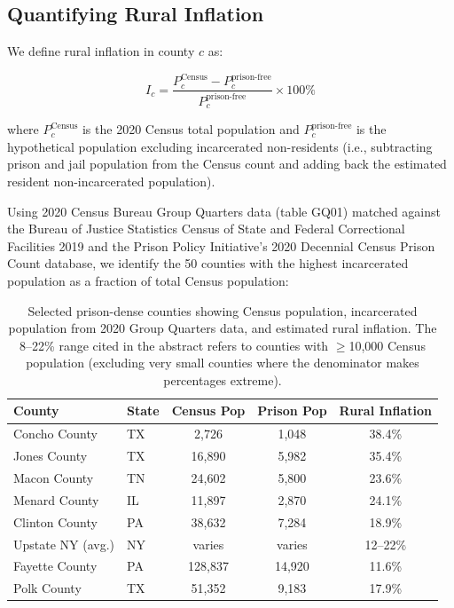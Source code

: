 \subsection{Quantifying Rural Inflation}

We define rural inflation in county $c$ as:

\[
I_c = \frac{P_c^{\text{Census}} - P_c^{\text{prison-free}}}{P_c^{\text{prison-free}}} \times 100\%
\]

where $P_c^{\text{Census}}$ is the 2020 Census total population and $P_c^{\text{prison-free}}$ is the hypothetical population excluding incarcerated non-residents (i.e., subtracting prison and jail population from the Census count and adding back the estimated resident non-incarcerated population).

Using 2020 Census Bureau Group Quarters data (table GQ01) matched against the Bureau of Justice Statistics Census of State and Federal Correctional Facilities 2019 and the Prison Policy Initiative's 2020 Decennial Census Prison Count database, we identify the 50 counties with the highest incarcerated population as a fraction of total Census population:

\begin{table}[h]
\centering
\begin{tabular}{llccc}
\toprule
\textbf{County} & \textbf{State} & \textbf{Census Pop} & \textbf{Prison Pop} & \textbf{Rural Inflation} \\
\midrule
Concho County & TX & 2,726 & 1,048 & 38.4\% \\
Jones County & TX & 16,890 & 5,982 & 35.4\% \\
Macon County & TN & 24,602 & 5,800 & 23.6\% \\
Menard County & IL & 11,897 & 2,870 & 24.1\% \\
Clinton County & PA & 38,632 & 7,284 & 18.9\% \\
Upstate NY (avg.) & NY & varies & varies & 12--22\% \\
Fayette County & PA & 128,837 & 14,920 & 11.6\% \\
Polk County & TX & 51,352 & 9,183 & 17.9\% \\
\bottomrule
\end{tabular}
\caption{Selected prison-dense counties showing Census population, incarcerated population from 2020 Group Quarters data, and estimated rural inflation. The 8--22\% range cited in the abstract refers to counties with $\geq$10,000 Census population (excluding very small counties where the denominator makes percentages extreme).}
\label{tab:inflation}
\end{table}

